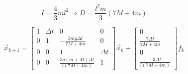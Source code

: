 \documentclass{article}
\begin{document}
\thispagestyle{empty}

$$
I = \frac{4}{3} m l^2 \Rightarrow D = \frac{l^2m}{3}(7M + 4m)
$$

$$
\vec{x}_{k+1} = \begin{bmatrix}1 & \Delta t & 0 & 0 \\ 0 & 1 & -\frac{3mg\Delta t}{7M+4m} & 0 \\ 0 & 0 & 1 & \Delta t \\ 0 & 0 & \frac{3g(m+M)\Delta t}{l(7M+4m)} & 1\end{bmatrix} \vec{x}_k + \begin{bmatrix}0 \\ \frac{7 \Delta t}{7M+4m} \\ 0 \\ \frac{-3\Delta t}{l(7M+4m)}\end{bmatrix} f_k
$$
\end{document}
